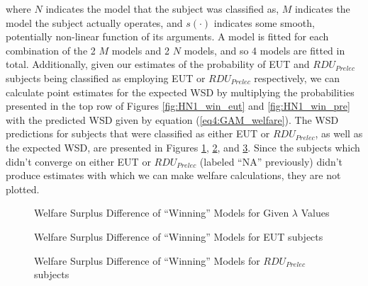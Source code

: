 \documentclass[../main.tex]{subfiles}
\begin{document}
\noindent where $N$ indicates the model that the subject was classified as, $M$ indicates the model the subject actually operates, and $s(\cdot)$ indicates some smooth, potentially non-linear function of its arguments.
A model is fitted for each combination of the 2 $M$ models and 2 $N$ models, and so 4 models are fitted in total.
Additionally, given our estimates of the probability of EUT and $\mathit{RDU_{Prelec}}$ subjects being classified as employing EUT or $\mathit{RDU_{Prelec}}$ respectively, we can calculate point estimates for the expected WSD by multiplying the probabilities presented in the top row of Figures \ref{fig:HN1_win_eut} and \ref{fig:HN1_win_pre} with the predicted WSD given by equation (\ref{eq4:GAM_welfare}).
The WSD predictions for subjects that were classified as either EUT or $\mathit{RDU_{Prelec}}$, as well as the expected WSD, are presented in Figures \ref{fig:HN1_wel_mu}, \ref{fig:HN1_wel_eut}, and \ref{fig:HN1_wel_pre}.
Since the subjects which didn't converge on either EUT or $\mathit{RDU_{Prelec}}$ (labeled \enquote{NA} previously) didn't produce estimates with which we can make welfare calculations, they are not plotted.

\begin{figure}[ht!]
	\center
	\caption{Welfare Surplus Difference of \enquote{Winning} Models for Given $\lambda$ Values}
	\label{fig:HN1_wel_mu}
\end{figure}

\begin{figure}[hb!]
	\center
	\caption{Welfare Surplus Difference of \enquote{Winning} Models for EUT subjects}
	\label{fig:HN1_wel_eut}
\end{figure}

\begin{figure}[ht!]
	\center
	\caption{Welfare Surplus Difference of \enquote{Winning} Models for $\mathit{RDU_{Prelec}}$ subjects}
	\label{fig:HN1_wel_pre}
\end{figure}
\end{document}
